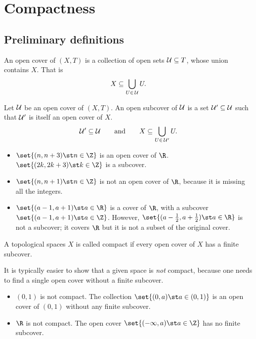 \section{Compactness}
\subsection{Preliminary definitions}
\begin{ndfn}
  An open cover of $(X,T)$ is a collection of open sets $\mathcal{U} \subseteq T$, whose union contains $X$. That is
  \begin{equation*}
    X \subseteq \bigcup_{U \in\,\mathcal{U}} U.
  \end{equation*}
\end{ndfn}

\begin{ndfn}[Subcover]
  Let $\mathcal{U}$ be an open cover of $(X,T)$. An open subcover of $\mathcal{U}$ is a set $\mathcal{U}' \subseteq \mathcal{U}$ such that $\mathcal{U}'$ is itself an open cover of $X$.
  \begin{equation*}
    \mathcal{U}' \subseteq \mathcal{U}
    \qquad\text{and}\qquad
    X \subseteq \bigcup_{U \in\,\mathcal{U}'} U.
  \end{equation*}
\end{ndfn}

\begin{negg}
  \phantom{}
  \begin{itemize}
  \item $\set{(n,n+3) \st n \in \Z}$ is an open cover of $\R$. $\set{(2k, 2k+3) \st k \in \Z}$ is a subcover.
  \item $\set{(n,n+1) \st n \in \Z}$ is not an open cover of $\R$, because it is missing all the integers.
  \item $\set{(a-1,a+1) \st a \in \R}$ is a cover of $\R$, with a subcover $\set{(a-1, a+1) \st a \in \Z}$. However, $\set{(a-\frac{1}{2}, a+\frac{1}{2}) \st a \in \R}$ is not a subcover; it covers $\R$ but it is not a subset of the original cover.
  \end{itemize}
\end{negg}

\begin{ndfn}[Compact]
  A topological spaces $X$ is called compact if every open cover of $X$ has a finite subcover.
\end{ndfn}

\begin{negg}
  It is typically easier to show that a given space is \emph{not} compact, because one needs to find a single open cover without a finite subcover.
  \begin{itemize}
  \item $(0,1)$ is not compact. The collection $\set{(0,a) \st a \in (0,1)}$ is an open cover of $(0,1)$ without any finite subcover.
  \item $\R$ is not compact. The open cover $\set{(-\infty, a) \st a \in \Z}$ has no finite subcover.
  \end{itemize}
\end{negg}

